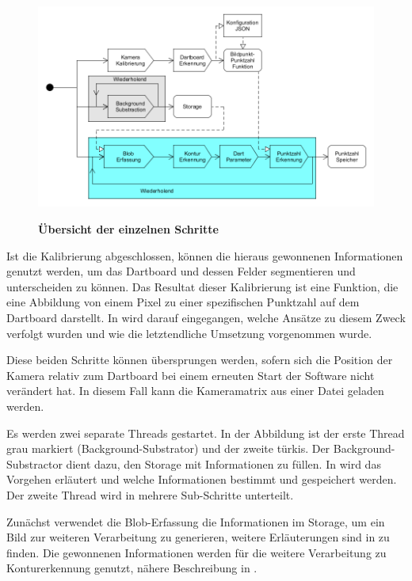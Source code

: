 \begin{figure}[ht]
\includegraphics[width=\textwidth]{media/pipeline.png}\\
\caption{\textbf{Übersicht der einzelnen Schritte}}
\label{Fig:pipeline}
\end{figure}

Ist die Kalibrierung abgeschlossen, können die hieraus gewonnenen Informationen genutzt werden, um das Dartboard und dessen Felder segmentieren und unterscheiden zu können. Das Resultat dieser Kalibrierung ist eine Funktion, die eine Abbildung von einem Pixel zu einer spezifischen Punktzahl auf dem Dartboard darstellt. In  wird darauf eingegangen, welche Ansätze zu diesem Zweck verfolgt wurden und wie die letztendliche Umsetzung vorgenommen wurde.

Diese beiden Schritte können übersprungen werden, sofern sich die Position der Kamera relativ zum Dartboard bei einem erneuten Start der Software nicht verändert hat. In diesem Fall kann die Kameramatrix aus einer Datei geladen werden.

Es werden zwei separate Threads gestartet. In der Abbildung ist der erste Thread grau markiert (Background-Substrator) und der zweite türkis. Der Background-Substractor dient dazu, den Storage mit Informationen zu füllen. In  wird das Vorgehen erläutert und welche Informationen bestimmt und gespeichert werden.
Der zweite Thread wird in mehrere Sub-Schritte unterteilt. 

Zunächst verwendet die Blob-Erfassung die Informationen im Storage, um ein Bild zur weiteren Verarbeitung zu generieren, weitere Erläuterungen sind in  zu finden.
Die gewonnenen Informationen werden für die weitere Verarbeitung zu Konturerkennung genutzt, nähere Beschreibung in .

